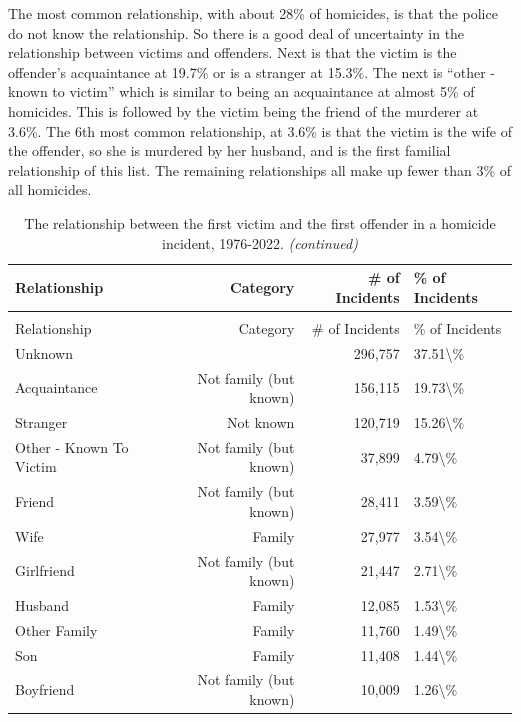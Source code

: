 \documentclass[
]{krantz}
\begin{document}
The most common relationship, with about 28\% of homicides,
is that the police do not know the relationship. So there is
a good deal of uncertainty in the relationship between
victims and offenders. Next is that the victim is the
offender's acquaintance at 19.7\% or is a stranger at
15.3\%. The next is ``other - known to victim'' which is
similar to being an acquaintance at almost 5\% of homicides.
This is followed by the victim being the friend of the
murderer at 3.6\%. The 6th most common relationship, at
3.6\% is that the victim is the wife of the offender, so she
is murdered by her husband, and is the first familial
relationship of this list. The remaining relationships all
make up fewer than 3\% of all homicides.

\begin{longtable}[t]{l|r|r|l}
\caption{\label{tab:shrRelationship}The relationship between the first victim and the first offender in a homicide incident, 1976-2022.}\\
\hline
Relationship & Category & \# of Incidents & \% of Incidents\\
\hline
\endfirsthead
\caption[]{\label{tab:shrRelationship}The relationship between the first victim and the first offender in a homicide incident, 1976-2022. \textit{(continued)}}\\
\hline
Relationship & Category & \# of Incidents & \% of Incidents\\
\hline
\endhead
Unknown &  & 296,757 & 37.51\textbackslash{}\%\\
\hline
Acquaintance & Not family (but known) & 156,115 & 19.73\textbackslash{}\%\\
\hline
Stranger & Not known & 120,719 & 15.26\textbackslash{}\%\\
\hline
Other - Known To Victim & Not family (but known) & 37,899 & 4.79\textbackslash{}\%\\
\hline
Friend & Not family (but known) & 28,411 & 3.59\textbackslash{}\%\\
\hline
Wife & Family & 27,977 & 3.54\textbackslash{}\%\\
\hline
Girlfriend & Not family (but known) & 21,447 & 2.71\textbackslash{}\%\\
\hline
Husband & Family & 12,085 & 1.53\textbackslash{}\%\\
\hline
Other Family & Family & 11,760 & 1.49\textbackslash{}\%\\
\hline
Son & Family & 11,408 & 1.44\textbackslash{}\%\\
\hline
Boyfriend & Not family (but known) & 10,009 & 1.26\textbackslash{}\%\\

\end{longtable}
\end{document}
